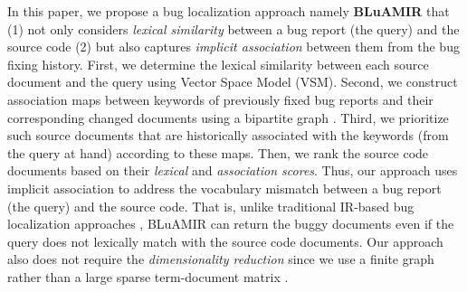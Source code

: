 \documentclass[sigconf,review,anonymous]{acmart}
\begin{document}
In this paper, we propose a bug localization approach namely \textbf{BLuAMIR} that (1) not only considers \emph{lexical similarity} between a bug report (the query) and the source code (2) but also captures \emph{implicit association} between them from the bug fixing history. First, we determine the lexical similarity between each source document and the query using Vector Space Model (VSM).
Second, we construct association maps between keywords of previously fixed bug reports and their corresponding changed documents using a bipartite graph \cite{bipartite}. Third, we prioritize such source documents that are historically associated with the keywords (from the query at hand) according to these maps. Then, we rank the source code documents based on their \emph{lexical} and \emph{association scores}.
Thus, our approach uses implicit association to address the vocabulary mismatch between a bug report (the query) and the source code. 
That is, unlike traditional IR-based bug localization approaches \cite{Jian,Saha}, BLuAMIR can return the buggy documents even if the query does not lexically match with the source code documents. Our approach also does not require the \emph{dimensionality reduction} since we use a finite graph rather than a large sparse term-document matrix \cite{MarcusLSI,MarcusMaletic}.
\end{document}
